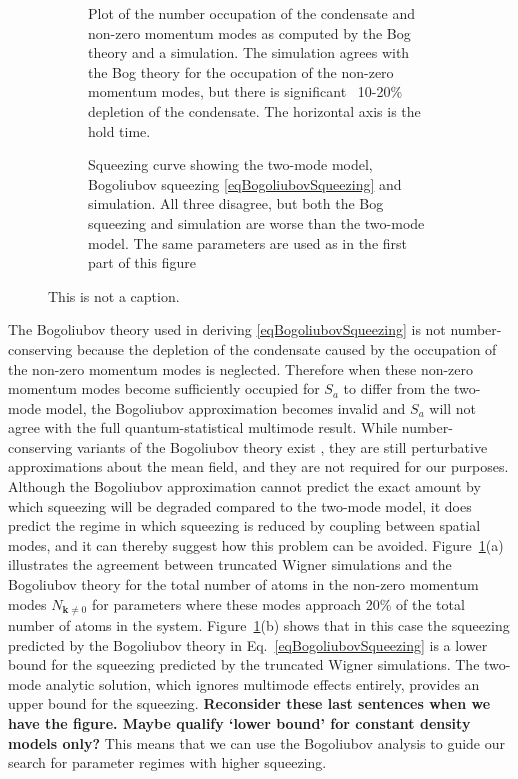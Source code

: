 \documentclass{iopart}
\begin{document}
\begin{figure}
  \centering
  \begin{subfigure}{.45\textwidth}
    \centering
    Plot of the number occupation of the condensate and non-zero momentum modes as computed by the Bog theory and a simulation.  The simulation agrees with the Bog theory for the occupation of the non-zero momentum modes, but there is significant ~10-20\% depletion of the condensate.  The horizontal axis is the hold time.
  \end{subfigure}
  \begin{subfigure}{.45\textwidth}
    \centering
Squeezing curve showing the two-mode model, Bogoliubov squeezing \eqref{eqBogoliubovSqueezing} and simulation.  All three disagree, but both the Bog squeezing and simulation are worse than the two-mode model.  The same parameters are used as in the first part of this figure
  \end{subfigure}%
\caption{This is not a caption.}
  \label{figBogSqueezingValidation}
\end{figure}

The Bogoliubov theory used in deriving \eqref{eqBogoliubovSqueezing} is not number-conserving because the depletion of the condensate caused by the occupation of the non-zero momentum modes is neglected.  Therefore when these non-zero momentum modes become sufficiently occupied for $S_a$ to differ from the two-mode model, the Bogoliubov approximation becomes invalid and $S_a$ will not agree with the full quantum-statistical multimode result.  While number-conserving variants of the Bogoliubov theory exist \cite{NumberConservingBog}, they are still perturbative approximations about the mean field, and they are not required for our purposes.  Although the Bogoliubov approximation cannot predict the exact amount by which squeezing will be degraded compared to the two-mode model, it does predict the regime in which squeezing is reduced by coupling between spatial modes, and it can thereby suggest how this problem can be avoided.  Figure~\ref{figBogSqueezingValidation}(a) illustrates the agreement between truncated Wigner simulations and the Bogoliubov theory for the total number of atoms in the non-zero momentum modes $N_{\mathbf{k}\neq 0}$ for parameters where these modes approach 20\% of the total number of atoms in the system.  Figure~\ref{figBogSqueezingValidation}(b) shows that in this case the squeezing predicted by the Bogoliubov theory in Eq.~\eqref{eqBogoliubovSqueezing} is a lower bound for the squeezing predicted by the truncated Wigner simulations.  The two-mode analytic solution, which ignores multimode effects entirely, provides an upper bound for the squeezing. \textbf{Reconsider these last sentences when we have the figure.  Maybe qualify `lower bound' for constant density models only?}  This means that we can use the Bogoliubov analysis to guide our search for parameter regimes with higher squeezing.
 
\end{document}
